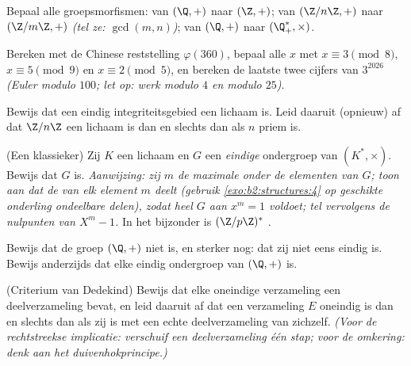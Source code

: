 \begin{exercise}[$\star\star$]\label{exo:b2:structures:7}
Bepaal alle groepsmorfismen: van $(\Q, +)$ naar $(\Z, +)$; van
$(\Z/n\Z, +)$ naar $(\Z/m\Z, +)$ \emph{(tel ze: $\gcd(m,n)$)}; van
$(\Q, +)$ naar $(\Q_+^*, \times)$.
\end{exercise}

\begin{exercise}[$\star\star$]\label{exo:b2:structures:8}
Bereken met de Chinese reststelling $\varphi(360)$, bepaal alle
$x$ met $x \equiv 3 \pmod 8$, $x \equiv 5 \pmod 9$ en $x \equiv 2
\pmod 5$, en bereken de laatste twee cijfers van $3^{2026}$
\emph{(Euler modulo $100$; let op: werk modulo $4$ en modulo
$25$)}.
\end{exercise}

\begin{exercise}[$\star\star\star$]\label{exo:b2:structures:9}
Bewijs dat een eindig integriteitsgebied een lichaam is. Leid
daaruit (opnieuw) af dat $\Z/n\Z$ een lichaam is dan en slechts
dan als $n$ priem is.
\end{exercise}

\begin{exercise}[$\star\star\star$]\label{exo:b2:structures:10}
(Een klassieker) Zij $K$ een lichaam en $G$ een \emph{eindige}
ondergroep van $(K^*, \times)$. Bewijs dat $G$  is.
\emph{Aanwijzing: zij $m$ de maximale  onder de elementen van
$G$; toon aan dat de  van elk element $m$ deelt (gebruik
\cref{exo:b2:structures:4} op geschikte onderling ondeelbare
delen), zodat heel $G$ aan $x^m = 1$ voldoet; tel vervolgens de
nulpunten van $X^m - 1$.} In het bijzonder is $(\Z/p\Z)^*$
.
\end{exercise}

\begin{exercise}[$\star\star\star$]\label{exo:b2:structures:11}
Bewijs dat de groep $(\Q, +)$ niet  is, en sterker nog:
dat zij niet eens eindig  is. Bewijs anderzijds dat
elke eindig  ondergroep van $(\Q, +)$  is.
\end{exercise}

\begin{exercise}[$\star\star$]\label{exo:b2:structures:12}
(Criterium van Dedekind) Bewijs dat elke oneindige verzameling een
 deelverzameling bevat, en leid daaruit af dat een
verzameling $E$ oneindig is dan en slechts dan als zij
 is met een echte deelverzameling van zichzelf.
\emph{(Voor de rechtstreekse implicatie: verschuif een 
deelverzameling één stap; voor de omkering: denk aan het
duivenhokprincipe.)}
\end{exercise}

